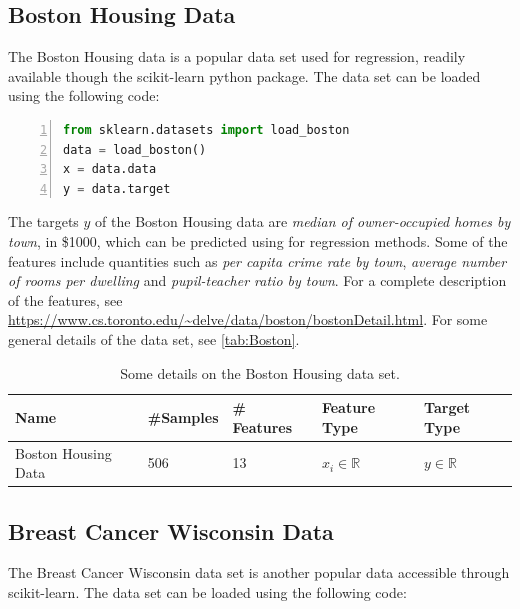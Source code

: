 \subsection{Boston Housing Data}\label{sec:Boston Housing Data}
The Boston Housing data is a popular data set used for regression, readily available though the scikit-learn python package\cite{scikit-learn}. The data set can be loaded using the following code:

\begin{lstlisting}[language=python, numbers=left]
from sklearn.datasets import load_boston
data = load_boston()
x = data.data
y = data.target
\end{lstlisting}

The targets $y$ of the Boston Housing data are \emph{median of owner-occupied homes by town}, in \$1000, which can be predicted using for regression methods. Some of the features include quantities such as \emph{per capita crime rate by town}, \emph{average number of rooms per dwelling} and \emph{pupil-teacher ratio by town}. For a complete description of the features, see \url{https://www.cs.toronto.edu/~delve/data/boston/bostonDetail.html}. For some general details of the data set, see \autoref{tab:Boston}.

\begin{table}[H]
\begin{tabular}{|l|l|l|l|l|}
\hline
 Name& \#Samples&  \# Features& Feature Type& Target Type \\ \hline
 Boston Housing Data&  506&  13& $x_i \in \mathbb{R}$ & $y \in \mathbb{R}$  \\ 
 \hline
 
\end{tabular}
\caption{Some details on the Boston Housing data set.}
\label{tab:Boston}
\end{table}

\subsection{Breast Cancer Wisconsin Data}\label{sec:Breast Cancer Data}

The Breast Cancer Wisconsin data set is another popular data accessible through scikit-learn. The data set can be loaded using the following code:

